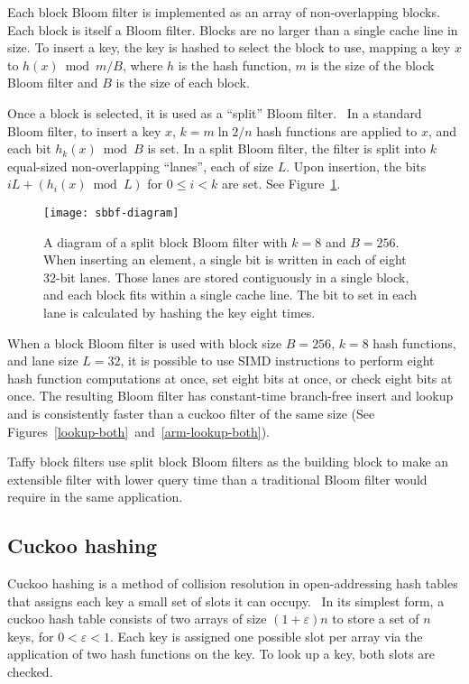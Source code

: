 \documentclass[letterpaper,twocolumn,10pt]{article}
\begin{document}
Each block Bloom filter is implemented as an array of non-overlapping blocks.
Each block is itself a Bloom filter.
Blocks are no larger than a single cache line in size.
To insert a key, the key is hashed to select the block to use, mapping a key $x$ to $h(x) \bmod m/B$, where $h$ is the hash function, $m$ is the size of the block Bloom filter and $B$ is the size of each block.

Once a block is selected, it is used as a ``split'' Bloom filter.~\cite{split-bloom}
In a standard Bloom filter, to insert a key $x$, $k = m \ln 2 / n$ hash functions are applied to $x$, and each bit $h_k(x) \bmod B$ is set.
In a split Bloom filter, the filter is split into $k$ equal-sized non-overlapping ``lanes'', each of size $L$.
Upon insertion, the bits $i L + (h_i(x) \bmod L)$ for $0 \le i < k$ are set.
See Figure~\ref{sbbf-diagram}.

\begin{figure}
  \texttt{[image: sbbf-diagram]}
\caption{\label{sbbf-diagram}
A diagram of a split block Bloom filter with $k = 8$ and $B = 256$.
When inserting an element, a single bit is written in each of eight 32-bit lanes.
Those lanes are stored contiguously in a single block, and each block fits within a single cache line.
The bit to set in each lane is calculated by hashing the key eight times.
}
\end{figure}

When a block Bloom filter is used with block size $B = 256$, $k = 8$ hash functions, and lane size $L = 32$, it is possible to use SIMD instructions to perform eight hash function computations at once, set eight bits at once, or check eight bits at once.
The resulting Bloom filter has constant-time branch-free insert and lookup and is consistently faster than a cuckoo filter of the same size (See Figures~\ref{lookup-both}~and~\ref{arm-lookup-both}).~\cite{cuckoo-filter-github,ultra-fast,overtakes,impala-bloom}

Taffy block filters use split block Bloom filters as the building block to make an extensible filter with lower query time than a traditional Bloom filter would require in the same application.

\subsection{Cuckoo hashing}

Cuckoo hashing is a method of collision resolution in open-address\-ing hash tables that assigns each key a small set of slots it can occupy.~\cite{cuckoo-journal}
In its simplest form, a cuckoo hash table consists of two arrays of size $(1 + \varepsilon)n$ to store a set of $n$ keys, for $0 < \varepsilon < 1$.
Each key is assigned one possible slot per array via the application of two hash functions on the key.
To look up a key, both slots are checked.
\end{document}
